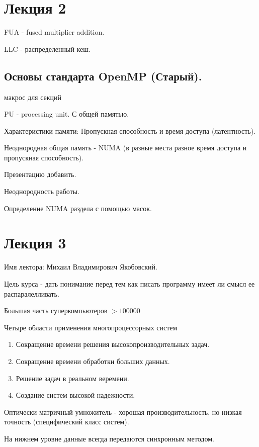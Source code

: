 \documentclass[14pt]{extarticle}
\begin{document}
\section{Лекция 2}

FUA - fused multiplier addition.

LLC - распределенный кеш.

\subsection{ Основы стандарта OpenMP (Старый). }

макрос для секций

PU - processing unit. С общей памятью.

Характеристики памяти: Пропускная способность и время доступа (латентность).

Неоднородная общая память - NUMA (в разные места разное время доступа и пропускная способность).

Презентацию добавить.

Неоднородность работы.

Определение NUMA раздела с помощью масок.

\section{Лекция 3}

Имя лектора: Михаил Владимирович Якобовский.

Цель курса - дать понимание перед тем как писать программу имеет ли смысл ее распаралелливать.

Большая часть суперкомпьютеров $ >100 000 $

Четыре области применения многопроцессорных систем

\begin{enumerate}
	\item Сокращение времени решения высокопроизводительных задач.
	\item Сокращение времени обработки больших данных.
	\item Решение задач в реальном веремени.
	\item Создание систем высокой надежности.
\end{enumerate}

Оптически матричный умножитель - хорошая производительность, но низкая точность (специфический класс систем).

На нижнем уровне данные всегда передаются синхронным методом.
\end{document}
